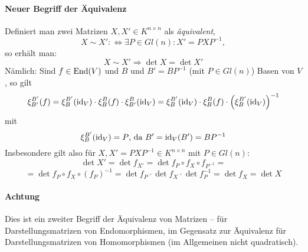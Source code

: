 \paragraph{Neuer Begriff der Äquivalenz}
	Definiert man zwei Matrizen $ X,X' \in K^{n\times n}$ als \emph{äquivalent},
		\[ X\sim X' :\Leftrightarrow \exists P\in Gl(n): X' =PXP^{-1}, \]
	so erhält man:
		\[ X\sim X' \Rightarrow \det X = \det X' \]
	Nämlich: Sind $ f\in \operatorname{End}(V) $ und $ B $ und $ B'=BP^{-1} $ (mit $ P\in Gl(n) $) Basen von $ V $, so gilt
		\[ \xi_{B'}^{B'}(f) = \xi_{B}^{B'}(\operatorname{id}_V)\cdot \xi_B^B(f)\cdot \xi_{B'}^{B}(\operatorname{id}_V) =
		\xi_{B}^{B'}(\operatorname{id}_V)\cdot \xi_B^B(f)\cdot \left(\xi^{B'}_{B}(\operatorname{id}_V)\right)^{-1} \]
	mit
		\[ \xi_B^{B'}(\operatorname{id}_V) = P \text{, da } B' = \operatorname{id}_V(B') = BP^{-1} \]
	Insbesondere gilt also für $ X,X' = PXP^{-1}\in K^{n\times n} $ mit $ P\in Gl(n) $:
		\[ \det X' = \det f_{X'} = \det f_P \circ f_X \circ f_{P^{-1}} =\]
		\[=\det f_P \circ f_X \circ (f_P)^{-1} = \det f_P \cdot \det f_X \cdot \det f_P^{-1} = \det f_X = \det X\]
\paragraph{Achtung}
	Dies ist ein zweiter Begriff der Äquivalenz von Matrizen -- für Darstellungsmatrizen von Endomorphismen, im Gegensatz zur Äquivalenz für Darstellungsmatrizen von Homomorphismen (im Allgemeinen nicht quadratisch).